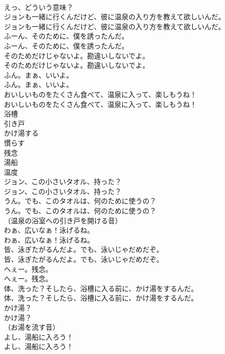 \documentclass[8pt]{extreport}
\begin{document}
\begin{CJK}{UTF8}{min}
\\	えっ、どういう意味？ 
\\	ジョンも一緒に行くんだけど、彼に温泉の入り方を教えて欲しいんだ。	
\\	ジョンも一緒に行くんだけど、彼に温泉の入り方を教えて欲しいんだ。 
\\	ふーん、そのために、僕を誘ったんだ。	
\\	ふーん、そのために、僕を誘ったんだ。　 
\\	そのためだけじゃないよ。勘違いしないでよ。	
\\	そのためだけじゃないよ。勘違いしないでよ。 
\\	ふん。まぁ、いいよ。	
\\	ふん。まぁ、いいよ。 
\\	おいしいものをたくさん食べて、温泉に入って、楽しもうね！	
\\	おいしいものをたくさん食べて、温泉に入って、楽しもうね！ 
\\	浴槽
\\	引き戸
\\	かけ湯する
\\	慣らす
\\	残念
\\	湯船
\\	温度
\\	ジョン、この小さいタオル、持った？	
\\	ジョン、この小さいタオル、持った？ 
\\	うん。でも、このタオルは、何のために使うの？	
\\	うん。でも、このタオルは、何のために使うの？ 
\\	（温泉の浴室への引き戸を開ける音）	
\\	わぁ、広いなぁ！泳げるね。	
\\	わぁ、広いなぁ！泳げるね。 
\\	皆、泳ぎたがるんだよ。でも、泳いじゃだめだぞ。	
\\	皆、泳ぎたがるんだよ。でも、泳いじゃだめだぞ。 
\\	へぇー。残念。	
\\	へぇー。残念。 
\\	体、洗った？そしたら、浴槽に入る前に、かけ湯をするんだ。	
\\	体、洗った？そしたら、浴槽に入る前に、かけ湯をするんだ。 
\\	かけ湯？	
\\	かけ湯？ 
\\	（お湯を流す音）	
\\	よし、湯船に入ろう！	
\\	よし、湯船に入ろう！ 

\end{CJK}
\end{document}
